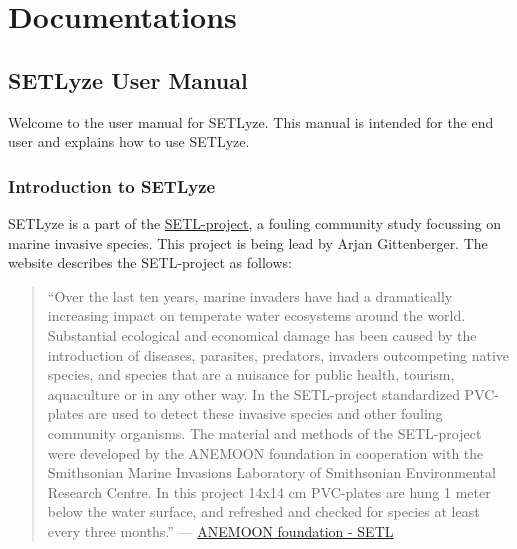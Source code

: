 \documentclass[letterpaper,10pt,english]{sphinxmanual}
\begin{document}
\chapter{Documentations}
\label{index:documentations}

\section{SETLyze User Manual}
\label{user_manual::doc}\label{user_manual:setlyze-user-manual}
Welcome to the user manual for SETLyze. This manual is intended for the
end user and explains how to use SETLyze.


\subsection{Introduction to SETLyze}
\label{user_manual:introduction-to-setlyze}
SETLyze is a part of the \href{http://www.anemoon.org/setl/}{SETL-project},
a fouling community study focussing on marine invasive species. This
project is being lead by Arjan Gittenberger. The website describes the
SETL-project as follows:
\begin{quote}

``Over the last ten years, marine invaders have had a dramatically
increasing impact on temperate water ecosystems around the world.
Substantial ecological and economical damage has been caused by the
introduction of diseases, parasites, predators, invaders outcompeting
native species, and species that are a nuisance for public health,
tourism, aquaculture or in any other way. In the SETL-project
standardized PVC-plates are used to detect these invasive species
and other fouling community organisms. The material and methods of
the SETL-project were developed by the ANEMOON foundation in
cooperation with the Smithsonian Marine Invasions Laboratory of
Smithsonian Environmental Research Centre. In this project 14x14
cm PVC-plates are hung 1 meter below the water surface, and refreshed
and checked for species at least every three months.'' ---
\href{http://www.anemoon.org/setl/}{ANEMOON foundation - SETL}
\end{quote}
\end{document}
